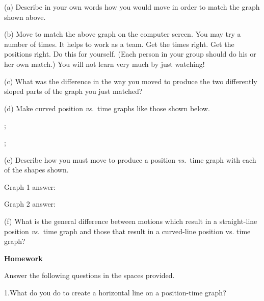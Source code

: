 (a) Describe in your own words how you would move in order to match the graph
shown above.
\answerspace{15mm}

(b) Move to match the above graph on the computer screen. You may try a number
of times. It helps to work as a team. Get the times right. Get the positions
right. Do this for yourself. (Each person in your group should do his or her
own match.) You will not learn very much by just watching!

(c) What was the difference in the way you moved to produce the two differently
sloped parts of the graph you just matched?
\answerspace{15mm}

(d) Make curved position \textit{vs.}~time graphs like those shown below.

\begin{center}
\begin{lab_axis}[lab_noticks_1quad,
	height = {1.5in}, width = {2in},
	xlabel={Time},
	ylabel={Position},
	title={Graph 1},
	]
;
\end{lab_axis}
\hspace{0.5in}
\begin{lab_axis}[lab_noticks_1quad,
	height = {1.5in}, width = {2in},
	xlabel={Time},
	ylabel={Position},
	title={Graph 2},
	]
;
\end{lab_axis}
\end{center}

(e) Describe how you must move to produce a position \textit{vs.}~time graph with each
of the shapes shown.

Graph 1 answer:
\answerspace{10mm}

Graph 2 answer:
\answerspace{10mm}

\pagebreak[2]
(f) What is the general difference between motions which result in a straight-line
position \textit{vs.}~time graph and those that result in a curved-line position vs.
time graph?
\answerspace{15mm}

\pagebreak[2]
\textbf{Homework} 

Answer the following questions in the spaces provided.

1.What do you do to create a horizontal line on a position-time graph?

